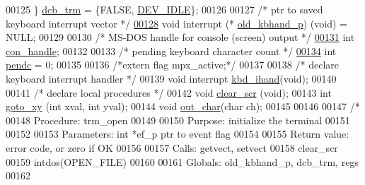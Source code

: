 \begin{DoxyCode}
00125         \} \hyperlink{trmdrive_8c_aeecf5b41137f812666e981eebea04e61}{dcb_trm} = \{FALSE, \hyperlink{trmdrive_8c_a6f821c66a608d5628538df4c12dcf4b9}{DEV_IDLE}\};
00126 
00127 \textcolor{comment}{/* ptr to saved keyboard interrupt vector */}
\hypertarget{trmdrive_8c_source_l00128}{}\hyperlink{trmdrive_8c_ae0117ec71cfad7cb444a3af48e82db69}{00128} \textcolor{keywordtype}{void} interrupt (* \hyperlink{trmdrive_8c_ae0117ec71cfad7cb444a3af48e82db69}{old_kbhand_p}) (void) = NULL;
00129 
00130 \textcolor{comment}{/* MS-DOS handle for console (screen) output */}
\hypertarget{trmdrive_8c_source_l00131}{}\hyperlink{trmdrive_8c_a679f108c9d4e6b006d00e83ec2a4aa96}{00131} \textcolor{keywordtype}{int} \hyperlink{trmdrive_8c_a679f108c9d4e6b006d00e83ec2a4aa96}{con_handle};
00132 
00133 \textcolor{comment}{/* pending keyboard character count */}
\hypertarget{trmdrive_8c_source_l00134}{}\hyperlink{trmdrive_8c_a152186ebee09ccf193037184a35ae013}{00134} \textcolor{keywordtype}{int} \hyperlink{trmdrive_8c_a152186ebee09ccf193037184a35ae013}{pendc} = 0;
00135 
00136 \textcolor{comment}{/*extern flag mpx\_active;*/}
00137 
00138 \textcolor{comment}{/* declare keyboard interrupt handler */}
00139 \textcolor{keywordtype}{void} interrupt \hyperlink{trmdrive_8c_aebfcd164b5b67675c3d7f86be3f68e94}{kbd_ihand}(\textcolor{keywordtype}{void});
00140 
00141 \textcolor{comment}{/* declare local procedures */}
00142 \textcolor{keywordtype}{void} \hyperlink{trmdrive_8c_af83e4fe07f82e4efe77504d26b445b25}{clear_scr} (\textcolor{keywordtype}{void});
00143 \textcolor{keywordtype}{int} \hyperlink{trmdrive_8c_a7dce95f2c134d55014f3b3fa1de35d33}{goto_xy} (\textcolor{keywordtype}{int} xval, \textcolor{keywordtype}{int} yval);
00144 \textcolor{keywordtype}{void} \hyperlink{trmdrive_8c_a46f4cf8a0c8928f76d9d25f530a9ac7e}{out_char}(\textcolor{keywordtype}{char} ch);
00145 
00146 
00147 \textcolor{comment}{/*}
00148 \textcolor{comment}{        Procedure: trm\_open}
00149 \textcolor{comment}{}
00150 \textcolor{comment}{        Purpose: initialize the terminal}
00151 \textcolor{comment}{}
00152 \textcolor{comment}{}
00153 \textcolor{comment}{        Parameters:     int *ef\_p       ptr to event flag}
00154 \textcolor{comment}{}
00155 \textcolor{comment}{        Return value: error code, or zero if OK}
00156 \textcolor{comment}{}
00157 \textcolor{comment}{        Calls:  getvect, setvect}
00158 \textcolor{comment}{                clear\_scr}
00159 \textcolor{comment}{                intdos(OPEN\_FILE)}
00160 \textcolor{comment}{}
00161 \textcolor{comment}{        Globals: old\_kbhand\_p, dcb\_trm, regs}
00162 \textcolor{comment}{}

\end{DoxyCode}
